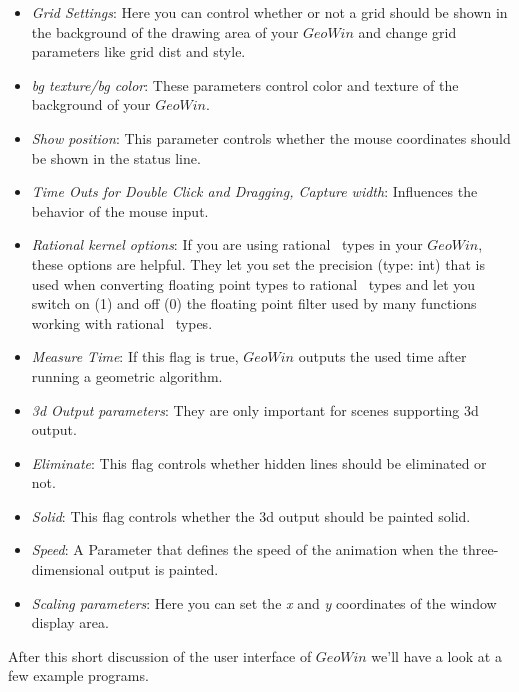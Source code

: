 \begin{itemize}

\item {\em Grid Settings}: Here you can control whether or not a grid should be shown in the
              background of the drawing area of your $GeoWin$ and change grid parameters like grid dist
	      and style.

\item {\em bg texture/bg color}: These parameters control color and texture of the background of 
              your $GeoWin$.

\item {\em Show position}: This parameter controls whether the mouse coordinates should be shown in the status line.
                 
\item {\em Time Outs for Double Click and Dragging, Capture width}: Influences the behavior of the mouse input. 

\item {\em Rational kernel options}: If you are using rational \leda\ types in your $GeoWin$, these options
               are helpful. They let you set the precision (type: int) that is used when converting floating
               point types to rational \leda\ types and let you switch on (1) and off (0) the floating point filter
               used by many functions working with rational \leda\ types. 

\item {\em Measure Time}:  If this flag is true, $GeoWin$ outputs the used time after running a geometric algorithm. 
       
\item {\em 3d Output parameters}: They are only important for scenes supporting 3d output. 

\item {\em Eliminate}: This flag controls whether hidden lines should be eliminated or not. 

\item {\em Solid}: This flag controls whether the 3d output should be painted solid.

\item {\em Speed}: A Parameter that defines the speed of the animation when the three-dimensional output is painted.

\item {\em Scaling parameters}:
Here you can set the {\em x} and {\em y} coordinates of the window display area.

\end{itemize}
After this short discussion of the user interface of $GeoWin$ we'll have a look at a few example programs.

